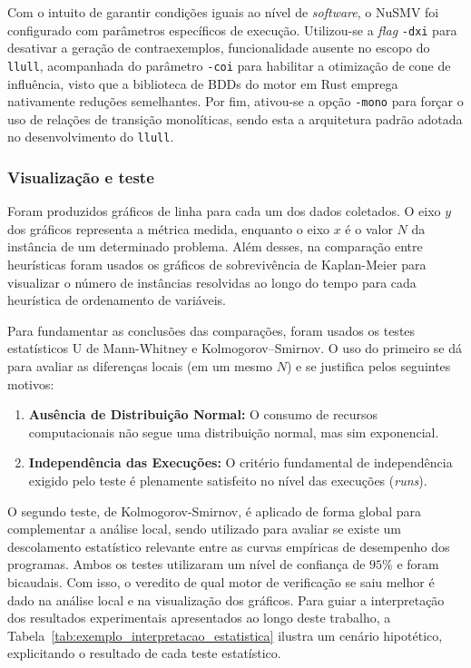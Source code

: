 \documentclass[cic,tc]{infufrgs}
\begin{document}
	Com o intuito de garantir condições iguais ao nível de \textit{software}, o NuSMV foi configurado com parâmetros específicos de execução. Utilizou-se a \textit{flag} \texttt{-dxi} para desativar a geração de contraexemplos, funcionalidade ausente no escopo do \texttt{llull}, acompanhada do parâmetro \texttt{-coi} para habilitar a otimização de cone de influência, visto que a biblioteca de BDDs do motor em Rust emprega nativamente reduções semelhantes.
	Por fim, ativou-se a opção \texttt{-mono} para forçar o uso de relações de transição monolíticas, sendo esta a arquitetura padrão adotada no desenvolvimento do \texttt{llull}.
	
	\subsubsection{Visualização e teste}
	Foram produzidos gráficos de linha para cada um dos dados coletados. 
	O eixo $y$ dos gráficos representa a métrica medida, enquanto o eixo $x$ é o valor $N$ da instância de um determinado problema. Além desses, na comparação entre heurísticas foram usados os gráficos de sobrevivência de Kaplan-Meier para visualizar o número de instâncias resolvidas ao longo do tempo para cada heurística de ordenamento de variáveis.
	
	Para fundamentar as conclusões das comparações, foram usados os testes estatísticos U de Mann-Whitney e Kolmogorov–Smirnov. 
	O uso do primeiro se dá para avaliar as diferenças locais (em um mesmo $N$) e se justifica pelos seguintes motivos:
	\begin{enumerate}
		\item \textbf{Ausência de Distribuição Normal:} O consumo de recursos computacionais não segue uma distribuição normal, mas sim exponencial.
		
		\item \textbf{Independência das Execuções:} O critério fundamental de independência exigido pelo teste é plenamente satisfeito no nível das execuções (\textit{runs}).
	\end{enumerate}
	O segundo teste, de Kolmogorov-Smirnov, é aplicado de forma global para complementar a análise local, sendo utilizado para avaliar se existe um descolamento estatístico relevante entre as curvas empíricas de desempenho dos programas. Ambos os testes utilizaram um nível de confiança de $95\%$ e foram bicaudais. Com isso, o veredito de qual motor de verificação se saiu melhor é dado na análise local e na visualização dos gráficos.
	Para guiar a interpretação dos resultados experimentais apresentados ao longo deste trabalho, a Tabela~\ref{tab:exemplo_interpretacao_estatistica} ilustra um cenário hipotético, explicitando o resultado de cada teste estatístico.
	
\end{document}
